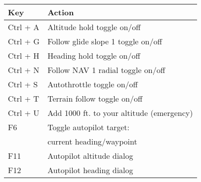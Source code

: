 \begin{tabular}{|l|l|}\hline
 Key              &         Action\\\hline
    Ctrl + A      &         Altitude hold\index{altitude hold} toggle on/off\\
    Ctrl + G      &         Follow glide slope 1 toggle on/off\\
    Ctrl + H      &         Heading hold\index{heading hold} toggle on/off\\
    Ctrl + N      &         Follow NAV 1 radial toggle on/off\\
    Ctrl + S      &         Autothrottle\index{autothrottle} toggle on/off\\
    Ctrl + T      &         Terrain follow toggle on/off\\
    Ctrl + U      &         Add 1000 ft. to your altitude (emergency)\\
    F6 		    		&         Toggle autopilot target:\\
                  &         current heading/waypoint\\
    F11           &         Autopilot altitude dialog\\
    F12           &         Autopilot heading dialog\\\hline
\end{tabular}

